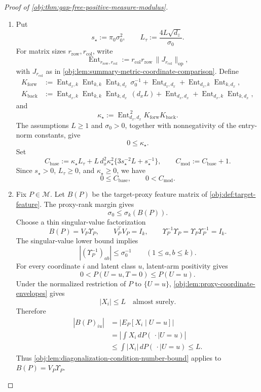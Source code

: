 \documentclass[11pt]{article}
\begin{document}
\begin{proof}[Proof of \cref{obj:thm:gap-free-positive-measure-modulus}]
\begin{enumerate}
\item Put
\[
s_\star:=\pi_0\sigma_0^2,
\qquad
L_\tau:=\frac{4L\sqrt{d_z}}{\sigma_0}.
\]
For matrix sizes \(r_{\mathrm{row}},r_{\mathrm{col}}\), write
\[
\operatorname{Ent}_{r_{\mathrm{row}},r_{\mathrm{col}}}
:=
r_{\mathrm{col}}r_{\mathrm{row}}\,
\|J_{r_{\mathrm{col}}}\|_{\mathrm{op}},
\]
with \(J_{r_{\mathrm{col}}}\) as in \cref{obj:lem:summary-metric-coordinate-comparison}.  Define
\[
\begin{aligned}
K_{\mathrm{forw}}
&:=
\operatorname{Ent}_{d_x,k}\operatorname{Ent}_{k,k}
\operatorname{Ent}_{k,d_x}\,\sigma_0^{-1}
+\operatorname{Ent}_{d_x,d_x}
+\operatorname{Ent}_{d_x,k}\operatorname{Ent}_{k,d_x},\\
K_{\mathrm{back}}
&:=
\operatorname{Ent}_{d_x,k}\operatorname{Ent}_{k,k}
\operatorname{Ent}_{k,d_x}\,(d_xL)
+\operatorname{Ent}_{d_x,d_x}
+\operatorname{Ent}_{d_x,k}\operatorname{Ent}_{k,d_x},
\end{aligned}
\]
and
\[
\kappa_\star
:=
\operatorname{Ent}_{d_x,d_x}^{\,2}K_{\mathrm{forw}}K_{\mathrm{back}} .
\]
The assumptions \(L\ge1\) and \(\sigma_0>0\), together with nonnegativity of the entry-norm constants, give
\[
0\le \kappa_\star .
\]
Set
\[
C_{\mathrm{base}}
:=
\kappa_\star L_\tau
+
L\,d_x^2\kappa_\star^2
\{3s_\star^{-2}L+s_\star^{-1}\},
\qquad
C_{\mathrm{mod}}:=C_{\mathrm{base}}+1 .
\]
Since \(s_\star>0\), \(L_\tau\ge0\), and \(\kappa_\star\ge0\), we have
\[
0\le C_{\mathrm{base}},
\qquad
0<C_{\mathrm{mod}} .
\]

\item Fix \(P\in\mathcal M\).  Let \(B(P)\) be the target-proxy feature matrix of \cref{obj:def:target-feature}.  The proxy-rank margin gives
\[
\sigma_0\le \sigma_k(B(P)).
\]
Choose a thin singular-value factorization
\[
B(P)=V_P\Upsilon_P,
\qquad
V_P^\top V_P=I_k,
\qquad
\Upsilon_P^{-1}\Upsilon_P=\Upsilon_P\Upsilon_P^{-1}=I_k .
\]
The singular-value lower bound implies
\[
|(\Upsilon_P^{-1})_{ab}|\le \sigma_0^{-1}
\qquad(1\le a,b\le k).
\]
For every coordinate \(i\) and latent class \(u\), latent-arm positivity gives
\[
0<P(U=u,T=0)\le P(U=u).
\]
Under the normalized restriction of \(P\) to \(\{U=u\}\), \cref{obj:lem:proxy-coordinate-envelopes} gives
\[
|X_i|\le L\quad\text{almost surely}.
\]
Therefore
\[
\begin{aligned}
|B(P)_{iu}|
&=\left|E_P[X_i\mid U=u]\right|\\
&=\left|\int X_i\,dP(\,\cdot\mid U=u)\right|\\
&\le \int |X_i|\,dP(\,\cdot\mid U=u)
\le L .
\end{aligned}
\]
Thus \cref{obj:lem:diagonalization-condition-number-bound} applies to \(B(P)=V_P\Upsilon_P\).


\end{enumerate}
\end{proof}
\end{document}
